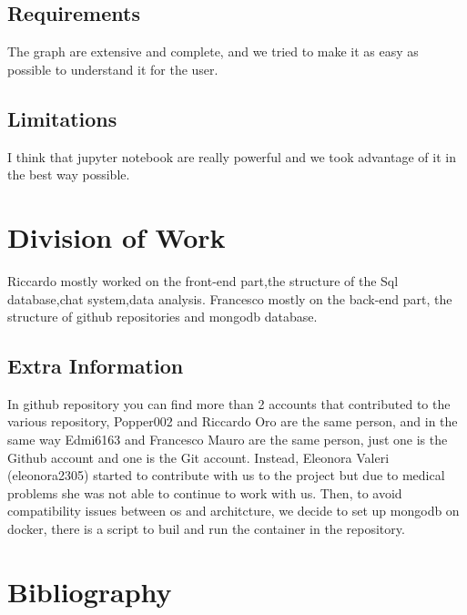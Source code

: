 \documentclass[conference]{IEEEtran}
\begin{document}
\subsection{Requirements}
The graph are extensive and complete, and we tried to make it as easy as possible to understand it for the user. 
\subsection{Limitations}
I think that jupyter notebook are really powerful and we took advantage of it in the best way possible.

\section{Division of Work}
Riccardo mostly worked on the front-end part,the structure of the Sql database,chat system,data analysis. Francesco mostly on the back-end part, the structure of github repositories and mongodb database.

\subsection{Extra Information}
In github repository you can find more than 2 accounts that contributed to the various repository, Popper002 and Riccardo Oro are the same person, and in the same way Edmi6163 and Francesco Mauro are the same person, just one is the Github account and one is the Git account. 
Instead, Eleonora Valeri (eleonora2305) started to contribute with us to the project but due to medical problems she was not able to continue to work with us.
Then, to avoid compatibility issues between os and architcture, we decide to set up mongodb on docker, there is a script to buil and run the container in the repository.


\section{Bibliography}

\end{document}
